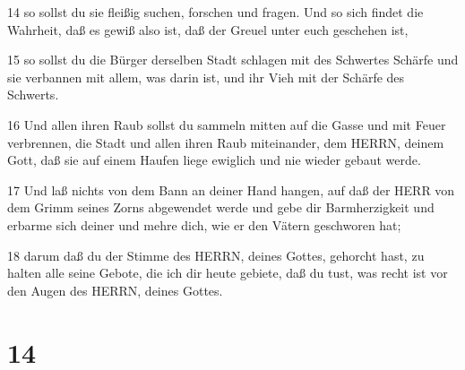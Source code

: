 \par 14 so sollst du sie fleißig suchen, forschen und fragen. Und so sich findet die Wahrheit, daß es gewiß also ist, daß der Greuel unter euch geschehen ist,
\par 15 so sollst du die Bürger derselben Stadt schlagen mit des Schwertes Schärfe und sie verbannen mit allem, was darin ist, und ihr Vieh mit der Schärfe des Schwerts.
\par 16 Und allen ihren Raub sollst du sammeln mitten auf die Gasse und mit Feuer verbrennen, die Stadt und allen ihren Raub miteinander, dem HERRN, deinem Gott, daß sie auf einem Haufen liege ewiglich und nie wieder gebaut werde.
\par 17 Und laß nichts von dem Bann an deiner Hand hangen, auf daß der HERR von dem Grimm seines Zorns abgewendet werde und gebe dir Barmherzigkeit und erbarme sich deiner und mehre dich, wie er den Vätern geschworen hat;
\par 18 darum daß du der Stimme des HERRN, deines Gottes, gehorcht hast, zu halten alle seine Gebote, die ich dir heute gebiete, daß du tust, was recht ist vor den Augen des HERRN, deines Gottes.

\chapter{14}

